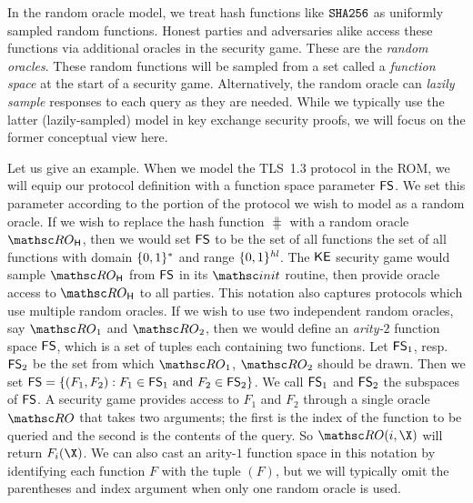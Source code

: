 In the random oracle model, we treat hash functions like $\texttt{SHA{256}}$ as uniformly sampled random functions. 
Honest parties and adversaries alike access these functions via additional oracles in the security game. 
These are the \emph{random oracles}. 
These random functions will be sampled from a set called a \emph{function space} at the start of a security game.
Alternatively, the random oracle can \emph{lazily sample} responses to each query as they are needed. 
While we typically use the latter (lazily-sampled) model in key exchange security proofs, we will focus on the former conceptual view here. 

Let us give an example. 
When we model the TLS~1.3 protocol in the ROM, we will equip our protocol definition with a function space parameter $\mathsf{FS}$. 
We set this parameter according to the portion of the protocol we wish to model as a random oracle. 
If we wish to replace the hash function $\hash$ with a random oracle $\ROhash$, then we would set $\mathsf{FS}$ to be the set of all functions the set of all functions with domain $\{0,1\}^*$ and range $\{0,1\}^{\mathit{hl}}$. 
The $\mathsf{KE}$ security game would sample $\ROhash$ from $\mathsf{FS}$ in its $\Initialize$ routine, then provide oracle access to $\ROhash$ to all parties. 
This notation also captures protocols which use multiple random oracles.
If we wish to use two independent random oracles, say $\RO_1$ and $\RO_2$, then we would define an \emph{arity-$2$} function space $\mathsf{FS}$, which is a set of tuples each containing two functions. 
Let $\mathsf{FS}_1$, resp. $\mathsf{FS}_2$ be the set from which $\RO_1$, $\RO_2$ should be drawn. 
Then we set $\mathsf{FS} = \{(F_1, F_2): F_1 \in \mathsf{FS}_1 \text{ and } F_2 \in \mathsf{FS}_2\}$.
We call $\mathsf{FS}_1$ and $\mathsf{FS}_2$ the subspaces of $\mathsf{FS}$. 
A security game provides access to $F_1$ and $F_2$ through a single oracle $\RO$ that takes two arguments; the first is the index of the function to be queried and the second is the contents of the query. 
So $\RO(i, \X)$ will return $F_i(\X)$.
We can also cast an arity-$1$ function space in this notation by identifying each function $F$ with the tuple $(F)$, but we will typically omit the parentheses and index argument when only one random oracle is used.


